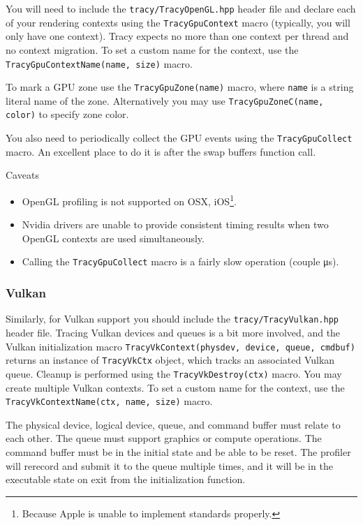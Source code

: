\documentclass[hidelinks,titlepage,a4paper]{article}
\begin{document}
You will need to include the \texttt{tracy/TracyOpenGL.hpp} header file and declare each of your rendering contexts using the \texttt{TracyGpuContext} macro (typically, you will only have one context). Tracy expects no more than one context per thread and no context migration. To set a custom name for the context, use the \texttt{TracyGpuContextName(name, size)} macro.

To mark a GPU zone use the \texttt{TracyGpuZone(name)} macro, where \texttt{name} is a string literal name of the zone. Alternatively you may use \texttt{TracyGpuZoneC(name, color)} to specify zone color.

You also need to periodically collect the GPU events using the \texttt{TracyGpuCollect} macro. An excellent place to do it is after the swap buffers function call.

\begin{bclogo}[
noborder=true,
couleur=black!5,
logo=\bcattention
]{Caveats}
\begin{itemize}
\item OpenGL profiling is not supported on OSX, iOS\footnote{Because Apple is unable to implement standards properly.}.
\item Nvidia drivers are unable to provide consistent timing results when two OpenGL contexts are used simultaneously.
\item Calling the \texttt{TracyGpuCollect} macro is a fairly slow operation (couple \si{\micro\second}).
\end{itemize}
\end{bclogo}

\subsubsection{Vulkan}

Similarly, for Vulkan support you should include the \texttt{tracy/TracyVulkan.hpp} header file. Tracing Vulkan devices and queues is a bit more involved, and the Vulkan initialization macro \texttt{TracyVkContext(physdev, device, queue, cmdbuf)} returns an instance of \texttt{TracyVkCtx} object, which tracks an associated Vulkan queue. Cleanup is performed using the \texttt{TracyVkDestroy(ctx)} macro. You may create multiple Vulkan contexts. To set a custom name for the context, use the \texttt{TracyVkContextName(ctx, name, size)} macro.

The physical device, logical device, queue, and command buffer must relate to each other. The queue must support graphics or compute operations. The command buffer must be in the initial state and be able to be reset. The profiler will rerecord and submit it to the queue multiple times, and it will be in the executable state on exit from the initialization function.
\end{document}
